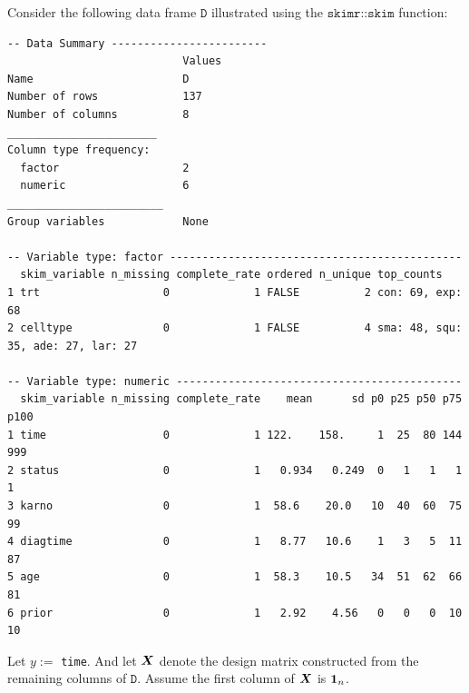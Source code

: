 \documentclass[12pt]{article}
\begin{document}

\problem Consider the following data frame $\texttt{D}$ illustrated using the $\texttt{skimr::skim}$ function:

\begin{Verbatim}[fontsize=\small]
-- Data Summary ------------------------
                           Values 
Name                       D     
Number of rows             137   
Number of columns          8     
_______________________          
Column type frequency:           
  factor                   2     
  numeric                  6     
________________________         
Group variables            None  

-- Variable type: factor ---------------------------------------------
  skim_variable n_missing complete_rate ordered n_unique top_counts              
1 trt                   0             1 FALSE          2 con: 69, exp: 68                  
2 celltype              0             1 FALSE          4 sma: 48, squ: 35, ade: 27, lar: 27

-- Variable type: numeric --------------------------------------------
  skim_variable n_missing complete_rate    mean      sd p0 p25 p50 p75 p100 
1 time                  0             1 122.    158.     1  25  80 144  999 
2 status                0             1   0.934   0.249  0   1   1   1    1 
3 karno                 0             1  58.6    20.0   10  40  60  75   99 
4 diagtime              0             1   8.77   10.6    1   3   5  11   87
5 age                   0             1  58.3    10.5   34  51  62  66   81 
6 prior                 0             1   2.92    4.56   0   0   0  10   10 
\end{Verbatim}

\noindent Let $y :=$ \texttt{time}. And let $\boldsymbol{X}$ denote the design matrix constructed from the remaining columns of $\texttt{D}$. Assume the first column of $\boldsymbol{X}$ is $\boldsymbol{1}_n$.
\end{document}
